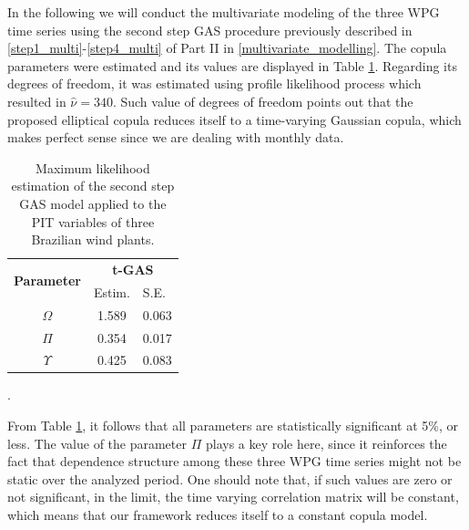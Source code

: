 \documentclass[a4paper]{IEEEtran}
\begin{document}
In the following we will conduct the multivariate modeling of the three WPG time series using the second step GAS procedure previously described in \ref{step1_multi}-\ref{step4_multi} of Part II in \ref{multivariate_modelling}. The copula parameters were estimated and its values are displayed in Table \ref{tab_3}. Regarding its degrees of freedom, it was estimated using profile likelihood process which resulted in $\hat{\nu}=340$. Such value of degrees of freedom points out that the proposed elliptical copula reduces itself to a time-varying Gaussian copula, which makes perfect sense since we are dealing with monthly data.
   
\begin{table}[htbp]
\centering
\caption{Maximum likelihood estimation of the second step GAS model applied to the PIT variables of three Brazilian wind plants.}
\label{my-label2}
\begin{tabular}{c|cc}
\hline
\multirow{2}{*}{{\bf Parameter}} & \multicolumn{2}{c}{{\bf t-GAS}}                       \\
                                 & \multicolumn{1}{l}{Estim.} & \multicolumn{1}{l}{S.E.} \\\hline
$\Omega$                         & 1.589                      & 0.063                    \\
$\Pi$                            & 0.354                      & 0.017                    \\
$\Upsilon$                       & 0.425                      & 0.083                    \\\hline
\end{tabular}
\label{tab_3}.
\end{table}
   
From Table \ref{tab_3}, it follows that all parameters are statistically significant at 5\%, or less. The value of the parameter $\Pi$ plays a key role here, since it reinforces the fact that dependence structure among these three WPG time series might not be static over the analyzed period. One should note that, if such values are zero or not significant, in the limit, the time varying correlation matrix will be constant, which means that our framework reduces itself to a constant copula model.
   
\end{document}
